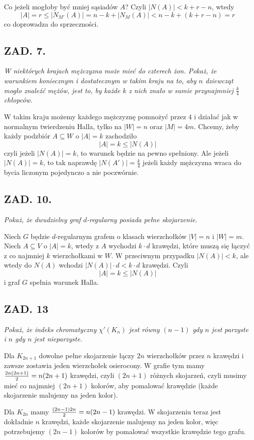 \documentclass{article}
\begin{document}
Co jeżeli mogłoby być mniej sąsiadów $A$? Czyli $|N(A)|<k+r-n$, wtedy
$$|A|=r\leq |N_{M'}(A)|=n-k+|N_M(A)|<n-k+(k+r-n)=r$$
co doprowadza do sprzeczności.

\subsection*{ZAD. 7.}
\emph{W niektórych krajach mężczyzna może mieć do czterech żon. Pokaż, że warunkiem koniecznym i dostatecznym w takim kraju na to, aby $n$ dziewcząt mogło znaleźć mężów, jest to, by każde $k$ z nich znało w sumie przynajmniej $\frac k4$ chłopców.}
\medskip

\medskip

W takim kraju możemy każdego mężczyznę pomnożyć przez $4$ i działać jak w normalnym twierdzeniu Halla, tylko na $|W|=n$ oraz $|M|=4m$. Chcemy, żeby każdy podzbiór $A\subseteq W$ o $|A|=k$ zachodziło
$$|A|=k\leq |N(A)|$$
czyli jeżeli $|N(A)|=k$, to warunek będzie na pewno spełniony. Ale jeżeli $|N(A)|=k$, to tak naprawdę $|N(A')|=\frac k4$ jeżeli każdy mężczyzna wraca do bycia liczonym pojedynczo a nie poczwórnie. 

\subsection*{ZAD. 10.}
\emph{Pokaż, że dwudzielny graf $d$-regularny posiada pełne skojarzenie.}
\medskip

\medskip

Niech $G$ będzie $d$-regularnym grafem o klasach wierzchołków $|V|=n$ i $|W|=m$. Niech $A\subseteq V$ o $|A|=k$, wtedy z $A$ wychodzi $k\cdot d$ krawędzi, które muszą się łączyć z co najmniej $k$ wierzchołkami w $W$. W przeciwnym przypadku $|N(A)|<k$, ale wtedy do $N(A)$ wchodzi $|N(A)|\cdot d<k\cdot d$ krawędzi. Czyli 
$$|A|=k\leq |N(A)|$$
i graf $G$ spełnia warunek Halla.

\subsection*{ZAD. 13}
\emph{Pokaż, że indeks chromatyczny $\chi'(K_n)$ jest równy $(n-1)$ gdy $n$ jest parzyste i $n$ gdy $n$ jest nieparzyste.}
\medskip

\medskip

Dla $K_{2n+1}$ dowolne pełne skojarzenie łączy $2n$ wierzchołków przez $n$ krawędzi i zawsze zostawia jeden wierzchołek osierocony. W grafie tym mamy ${2n(2n+1)\over 2}=n(2n+1)$ krawędzi, czyli $(2n+1)$ różnych skojarzeń, czyli musimy mieć co najmniej $(2n+1)$ kolorów, aby pomalować krawędzie (każde skojarzenie malujemy na jeden kolor).
\smallskip

Dla $K_{2n}$ mamy ${(2n-1)2n\over2}=n(2n-1)$ krawędzi. W skojarzeniu teraz jest dokładnie $n$ krawędzi, każde skojarzenie malujemy na jeden kolor, więc potrzebujemy $(2n-1)$ kolorów by pomalować wszystkie krawędzie tego grafu.
\end{document}
